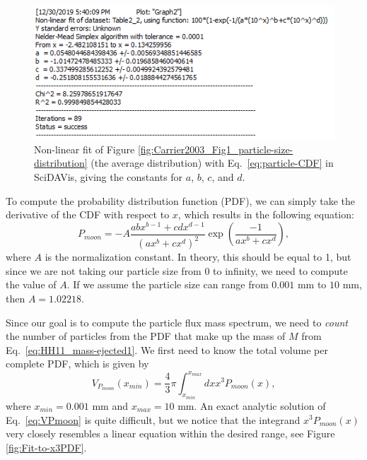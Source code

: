 \documentclass{hitec}
\begin{document}
\begin{figure}[h!]
	\centering
	\includegraphics[scale=1]{Fit-to-CDF.PNG}
	\caption{Non-linear fit of Figure \ref{fig:Carrier2003_Fig1_particle-size-distribution} (the average distribution) with Eq.\ \ref{eq:particle-CDF} in \textsf{SciDAVis}, giving the constants for $a$, $b$, $c$, and $d$.}\label{fig:Fit-to-CDF}
\end{figure}

To compute the probability distribution function (PDF), we can simply take the derivative of the CDF with respect to $x$, which results in the following equation:
\begin{equation}
P_{moon} = -A\frac{abx^{b-1}+cdx^{d-1}}{(ax^b+cx^d)^2}\exp\left(\frac{-1}{ax^b+cx^d}\right),
\end{equation}
where $A$ is the normalization constant. In theory, this should be equal to 1, but since we are not taking our particle size from 0 to infinity, we need to compute the value of $A$. If we assume the particle size can range from $0.001$ mm to $10$ mm, then $A = 1.02218$.

Since our goal is to compute the particle flux mass spectrum, we need to \textit{count} the number of particles from the PDF that make up the mass of $M$ from Eq.\ \ref{eq:HH11_mass-ejected1}. We first need to know the total volume per complete PDF, which is given by
\begin{equation}\label{eq:VPmoon}
V_{P_{moon}}(x_{min}) = \frac{4}{3}\pi \int_{x_{min}}^{x_{max}}dx x^3 P_{moon}(x),
\end{equation}
where $x_{min} = 0.001$ mm and $x_{max} = 10$ mm. An exact analytic solution of Eq.\ \ref{eq:VPmoon} is quite difficult, but we notice that the integrand $x^3 P_{moon}(x)$ very closely resembles a linear equation within the desired range, see Figure \ref{fig:Fit-to-x3PDF}.
\end{document}
